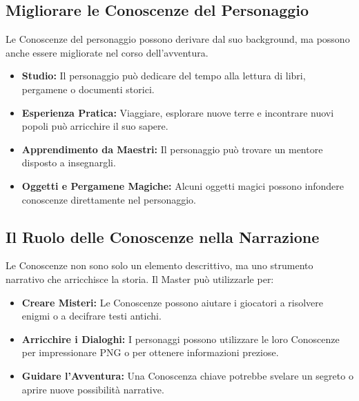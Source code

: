 \documentclass[../manuale_main.tex]{subfiles}
\begin{document}
\vspace{0.3cm}

\subsection{Migliorare le Conoscenze del Personaggio}
Le Conoscenze del personaggio possono derivare dal suo background, ma possono anche essere migliorate nel corso dell’avventura.

\begin{itemize}
    \item \textbf{Studio:} Il personaggio può dedicare del tempo alla lettura di libri, pergamene o documenti storici.
    
    \item \textbf{Esperienza Pratica:} Viaggiare, esplorare nuove terre e incontrare nuovi popoli può arricchire il suo sapere.
    
    \item \textbf{Apprendimento da Maestri:} Il personaggio può trovare un mentore disposto a insegnargli.
    
    \item \textbf{Oggetti e Pergamene Magiche:} Alcuni oggetti magici possono infondere conoscenze direttamente nel personaggio.
\end{itemize}

\vspace{0.3cm}

\subsection{Il Ruolo delle Conoscenze nella Narrazione}
Le Conoscenze non sono solo un elemento descrittivo, ma uno strumento narrativo che arricchisce la storia. Il Master può utilizzarle per:

\begin{itemize}
    \item \textbf{Creare Misteri:} Le Conoscenze possono aiutare i giocatori a risolvere enigmi o a decifrare testi antichi.
    \item \textbf{Arricchire i Dialoghi:} I personaggi possono utilizzare le loro Conoscenze per impressionare PNG o per ottenere informazioni preziose.
    \item \textbf{Guidare l'Avventura:} Una Conoscenza chiave potrebbe svelare un segreto o aprire nuove possibilità narrative.
\end{itemize}
\end{document}
